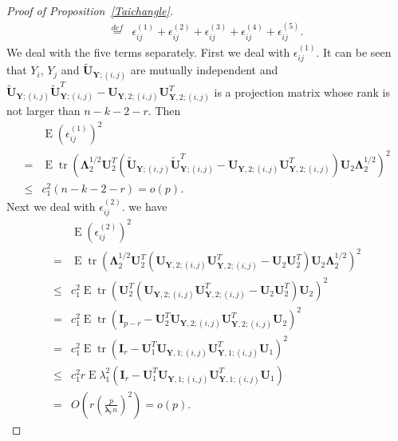 \documentclass[12pt]{article} %
\DeclareMathOperator{\mytr}{tr}
\DeclareMathOperator{\myE}{E}
\newcommand{\bY}{\mathbf{Y}}
\newcommand{\bI}{\mathbf{I}}
\newcommand{\bU}{\mathbf{U}}
\newcommand{\bfsym}[1]{\ensuremath{\boldsymbol{#1}}}
\def\blambda {\bfsym {\lambda}}
\def\bLambda {\bfsym {\Lambda}}
\theoremstyle{definition}
\begin{document}
\begin{proof}[Proof of Proposition~\ref{Taichangle}]
\begin{equation}
\begin{aligned}
        \overset{def}{=} &
        \epsilon_{ij}^{(1)}+
        \epsilon_{ij}^{(2)}+
        \epsilon_{ij}^{(3)}+
        \epsilon_{ij}^{(4)}+
        \epsilon_{ij}^{(5)}.
    \end{aligned}
    \end{equation}
        We deal with the five terms separately.
        First we deal with $\epsilon_{ij}^{(1)}$.
        It can be seen that
         $Y_i$, $Y_j$ and $\tilde{\bU}_{\bY;(i,j)}$ are mutually independent and
        $\tilde{\bU}_{\bY;(i,j)} \tilde{\bU}_{\bY;(i,j)}^T-\bU_{\bY,2;(i,j)} \bU_{\bY,2;(i,j)}^T$ is a projection matrix whose rank is not larger than $n-k-2-r$.
        Then
        $$
        \begin{aligned}
            &\myE (\epsilon_{ij}^{(1)})^2\\
            =&\myE \mytr (\bLambda_2^{1/2}\bU_2^T(\tilde{\bU}_{\bY;(i,j)} \tilde{\bU}_{\bY;(i,j)}^T-\bU_{\bY,2;(i,j)} \bU_{\bY,2;(i,j)}^T)\bU_2 \bLambda_2^{1/2})^2\\
            \leq & c_1^2 (n-k-2-r)=o(p).
        \end{aligned}
        $$
        Next we deal with $\epsilon_{ij}^{(2)}$. we have
        $$
        \begin{aligned}
            &\myE (\epsilon_{ij}^{(2)})^2\\
            =&\myE \mytr (\bLambda_2^{1/2}\bU_2^T(
            \bU_{\bY,2;(i,j)} \bU_{\bY,2;(i,j)}^T-\bU_2\bU_2^T
            )\bU_2 \bLambda_2^{1/2})^2\\
            \leq & c_1^2 
            \myE \mytr (\bU_2^T(
            \bU_{\bY,2;(i,j)} \bU_{\bY,2;(i,j)}^T-\bU_2\bU_2^T
            )\bU_2 )^2\\
            = & c_1^2 
            \myE \mytr (
            \bI_{p-r}-\bU_2^T \bU_{\bY,2;(i,j)} \bU_{\bY,2;(i,j)}^T\bU_2
             )^2\\
            = & c_1^2
        \myE \mytr (\bI_r-\bU_1^T \bU_{\bY,1;(i,j)}\bU_{\bY,1;(i,j)}^T \bU_1)^2\\
            \leq  & c_1^2 r
         \myE \lambda_1^2 (\bI_r-\bU_1^T \bU_{\bY,1;(i,j)}\bU_{\bY,1;(i,j)}^T \bU_1)\\
            =&  O(r (\frac{p}{\blambda_r n})^2)=o(p).
        \end{aligned}
        $$


\end{proof}
\end{document}
